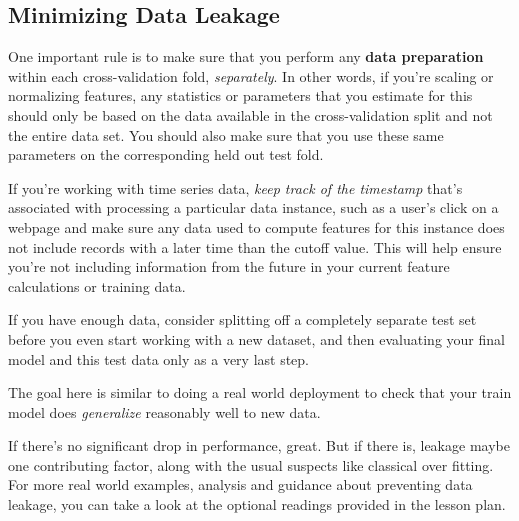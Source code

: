 \begin{multicols}{2}
\subsection{Minimizing Data Leakage}

One important rule is to make sure that you perform any \textbf{data preparation} within each cross-validation fold, \emph{separately}. In other words, if you're scaling or normalizing features, any statistics or parameters that you estimate for this should only be based on the data available in the cross-validation split and not the entire data set. You should also make sure that you use these same parameters on the corresponding held out test fold. 

If you're working with time series data, \emph{keep track of the timestamp} that's associated with processing a particular data instance, such as a user's click on a webpage and make sure any data used to compute features for this instance does not include records with a later time than the cutoff value. This will help ensure you're not including information from the future in your current feature calculations or training data. 

If you have enough data, consider splitting off a completely separate test set before you even start working with a new dataset, and then evaluating your final model and this test data only as a very last step. 

The goal here is similar to doing a real world deployment to check that your train model does \emph{generalize} reasonably well to new data. 

If there's no significant drop in performance, great. But if there is, leakage maybe one contributing factor, along with the usual suspects like classical over fitting. For more real world examples, analysis and guidance about preventing data leakage, you can take a look at the optional readings provided in the lesson plan. 

\end{multicols}